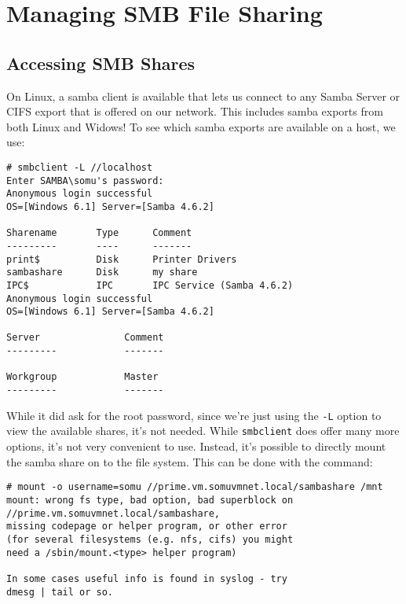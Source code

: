 \chapter{Managing SMB File Sharing}

\section{Accessing SMB Shares}
On Linux, a samba client is available that lets us connect to any Samba Server or CIFS export that is offered on our network. This includes samba exports from both Linux and Widows! To see which samba exports are available on a host, we use:

\vspace{-15pt}
\begin{verbatim}
# smbclient -L //localhost
Enter SAMBA\somu's password: 
Anonymous login successful
OS=[Windows 6.1] Server=[Samba 4.6.2]

Sharename       Type      Comment
---------       ----      -------
print$          Disk      Printer Drivers
sambashare      Disk      my share
IPC$            IPC       IPC Service (Samba 4.6.2)
Anonymous login successful
OS=[Windows 6.1] Server=[Samba 4.6.2]

Server               Comment
---------            -------

Workgroup            Master
---------            -------
\end{verbatim}
\vspace{-10pt}	

\noindent
While it did ask for the root password, since we're just using the \verb|-L| option to view the available shares, it's not needed. While \verb|smbclient| does offer many more options, it's not very convenient to use. Instead, it's possible to directly mount the samba share on to the file system. This can be done with the command:

\vspace{-15pt}
\begin{verbatim}
# mount -o username=somu //prime.vm.somuvmnet.local/sambashare /mnt
mount: wrong fs type, bad option, bad superblock on //prime.vm.somuvmnet.local/sambashare,
missing codepage or helper program, or other error
(for several filesystems (e.g. nfs, cifs) you might
need a /sbin/mount.<type> helper program)

In some cases useful info is found in syslog - try
dmesg | tail or so.
\end{verbatim}
\vspace{-10pt}	

